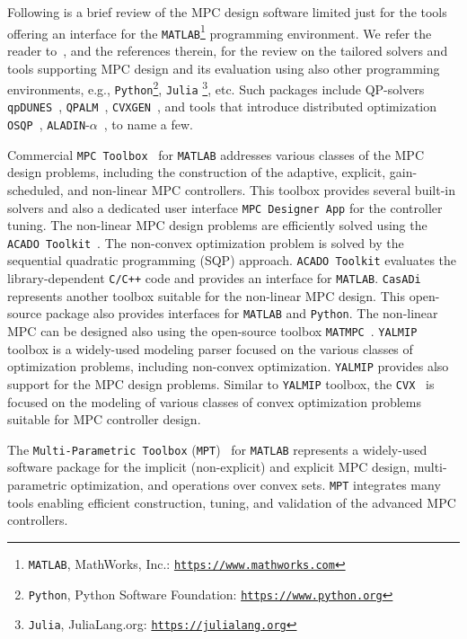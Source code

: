 \documentclass[letterpaper, 10 pt, conference]{ieeeconf}
\begin{document}
	Following is a brief review of the MPC design software limited just for the tools offering an interface for the \texttt{MATLAB}\footnote{\texttt{MATLAB}, MathWorks, Inc.: \texttt{\url{https://www.mathworks.com}}} programming environment. We refer the reader to~\cite{KF18,LT17,HS22}, 
	and the references therein, for the review on the tailored solvers and tools supporting MPC design and its evaluation using also other programming environments, e.g., \texttt{Python}\footnote{\texttt{Python}, Python Software Foundation: \texttt{\url{https://www.python.org}}}, \texttt{Julia} \footnote{\texttt{Julia}, JuliaLang.org: \texttt{\url{https://julialang.org}}}, etc. Such packages include QP-solvers \texttt{qpDUNES}~\cite{qpDUNES}, \texttt{QPALM}~\cite{QPALM}, \texttt{CVXGEN}~\cite{CVXGEN}, and tools that introduce distributed optimization \texttt{OSQP}~\cite{OSQP}, \texttt{ALADIN}-$\alpha$~\cite{EJ21}, to name a few. 
	
	Commercial \texttt{MPC Toolbox}~\cite{MPC_toolbox} for \texttt{MATLAB} addresses various classes of the MPC design problems, including the construction of the adaptive, explicit, gain-scheduled, and non-linear MPC controllers. This toolbox provides several built-in solvers and also a dedicated user interface \texttt{MPC Designer App} for the controller tuning. 
	The non-linear MPC design problems are efficiently solved using the \texttt{ACADO Toolkit}~\cite{ACADO_Toolkit}. The non-convex optimization problem is solved by the sequential quadratic programming (SQP) approach.  \texttt{ACADO Toolkit} evaluates the library-dependent \texttt{C/C++} code and provides an interface for \texttt{MATLAB}. 
	\texttt{CasADi}~\cite{CasADi} represents another toolbox suitable for the non-linear MPC design. This open-source package also provides interfaces for \texttt{MATLAB} and \texttt{Python}. 
	The non-linear MPC can be designed also using the open-source toolbox \texttt{MATMPC}~\cite{MATMPC}. 
	\texttt{YALMIP}~\cite{L04} toolbox is a widely-used modeling parser focused on the various classes of optimization problems, including non-convex optimization. \texttt{YALMIP} provides also support for the MPC design problems. 
	Similar to \texttt{YALMIP} toolbox, the \texttt{CVX}~\cite{GB08} is focused on the modeling of various classes of convex optimization problems suitable for MPC controller design. 
	
	The \texttt{Multi-Parametric Toolbox} (\texttt{MPT})~\cite{MPT3} for \texttt{MATLAB} represents a widely-used software package for the implicit (non-explicit) and explicit MPC design, multi-parametric optimization, and operations over convex sets. \texttt{MPT} integrates many tools enabling efficient construction, tuning, and validation of the advanced MPC controllers. 
	
\end{document}
